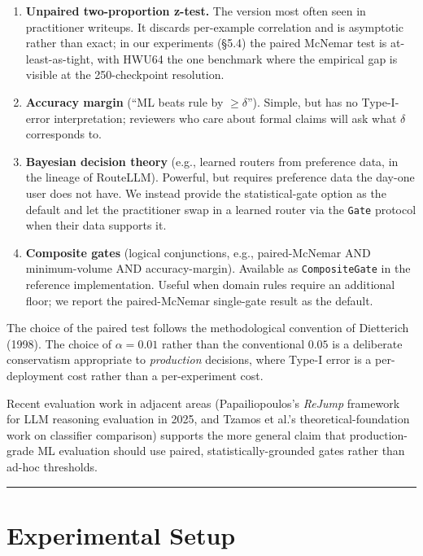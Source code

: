 \begin{enumerate}
\def\labelenumi{\arabic{enumi}.}
\tightlist
\item
  \textbf{Unpaired two-proportion z-test.} The version most often seen
  in practitioner writeups. It discards per-example correlation and is
  asymptotic rather than exact; in our experiments (§5.4) the paired
  McNemar test is at-least-as-tight, with HWU64 the one benchmark where
  the empirical gap is visible at the 250-checkpoint resolution.
\item
  \textbf{Accuracy margin} (``ML beats rule by \(\ge \delta\)'').
  Simple, but has no Type-I-error interpretation; reviewers who care
  about formal claims will ask what \(\delta\) corresponds to.
\item
  \textbf{Bayesian decision theory} (e.g., learned routers from
  preference data, in the lineage of RouteLLM). Powerful, but requires
  preference data the day-one user does not have. We instead provide the
  statistical-gate option as the default and let the practitioner swap
  in a learned router via the \texttt{Gate} protocol when their data
  supports it.
\item
  \textbf{Composite gates} (logical conjunctions, e.g., paired-McNemar
  AND minimum-volume AND accuracy-margin). Available as
  \texttt{CompositeGate} in the reference implementation. Useful when
  domain rules require an additional floor; we report the paired-McNemar
  single-gate result as the default.
\end{enumerate}

The choice of the paired test follows the methodological convention of
Dietterich (1998). The choice of \(\alpha = 0.01\) rather than the
conventional \(0.05\) is a deliberate conservatism appropriate to
\emph{production} decisions, where Type-I error is a per-deployment cost
rather than a per-experiment cost.

Recent evaluation work in adjacent areas (Papailiopoulos's \emph{ReJump}
framework for LLM reasoning evaluation in 2025, and Tzamos et al.'s
theoretical-foundation work on classifier comparison) supports the more
general claim that production-grade ML evaluation should use paired,
statistically-grounded gates rather than ad-hoc thresholds.

\begin{center}\rule{0.5\linewidth}{0.5pt}\end{center}

\section{Experimental Setup}\label{experimental-setup}

